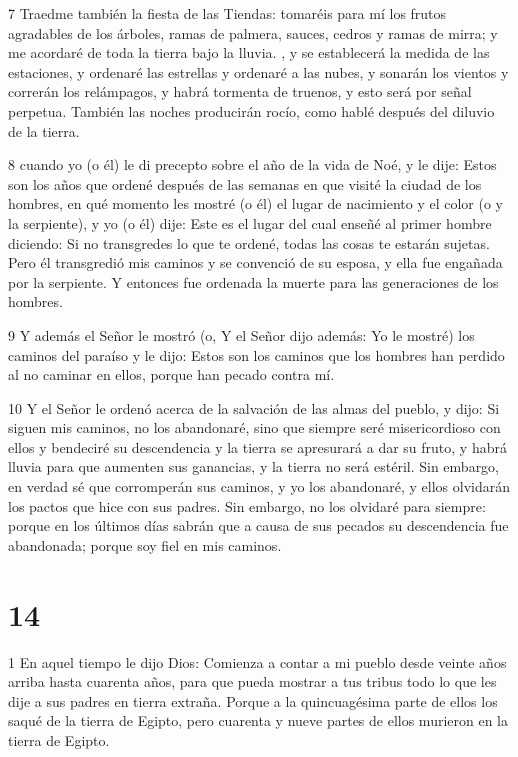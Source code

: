 \par 7 Traedme también la fiesta de las Tiendas: tomaréis para mí los frutos agradables de los árboles, ramas de palmera, sauces, cedros y ramas de mirra; y me acordaré de toda la tierra bajo la lluvia. , y se establecerá la medida de las estaciones, y ordenaré las estrellas y ordenaré a las nubes, y sonarán los vientos y correrán los relámpagos, y habrá tormenta de truenos, y esto será por señal perpetua. También las noches producirán rocío, como hablé después del diluvio de la tierra.

\par 8 cuando yo (o él) le di precepto sobre el año de la vida de Noé, y le dije: Estos son los años que ordené después de las semanas en que visité la ciudad de los hombres, en qué momento les mostré (o él) el lugar de nacimiento y el color (o y la serpiente), y yo (o él) dije: Este es el lugar del cual enseñé al primer hombre diciendo: Si no transgredes lo que te ordené, todas las cosas te estarán sujetas. Pero él transgredió mis caminos y se convenció de su esposa, y ella fue engañada por la serpiente. Y entonces fue ordenada la muerte para las generaciones de los hombres.

\par 9 Y además el Señor le mostró (o, Y el Señor dijo además: Yo le mostré) los caminos del paraíso y le dijo: Estos son los caminos que los hombres han perdido al no caminar en ellos, porque han pecado contra mí.

\par 10 Y el Señor le ordenó acerca de la salvación de las almas del pueblo, y dijo: Si siguen mis caminos, no los abandonaré, sino que siempre seré misericordioso con ellos y bendeciré su descendencia y la tierra se apresurará a dar su fruto, y habrá lluvia para que aumenten sus ganancias, y la tierra no será estéril. Sin embargo, en verdad sé que corromperán sus caminos, y yo los abandonaré, y ellos olvidarán los pactos que hice con sus padres. Sin embargo, no los olvidaré para siempre: porque en los últimos días sabrán que a causa de sus pecados su descendencia fue abandonada; porque soy fiel en mis caminos.

\chapter{14}

\par 1 En aquel tiempo le dijo Dios: Comienza a contar a mi pueblo desde veinte años arriba hasta cuarenta años, para que pueda mostrar a tus tribus todo lo que les dije a sus padres en tierra extraña. Porque a la quincuagésima parte de ellos los saqué de la tierra de Egipto, pero cuarenta y nueve partes de ellos murieron en la tierra de Egipto.

